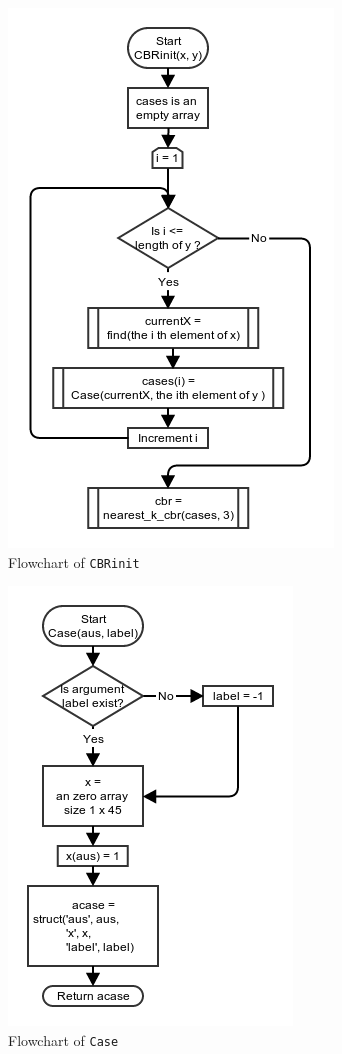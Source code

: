 \documentclass[10pt,a4paper]{article}
\begin{document}
\begin{figure}[!ht]
	\centering
	\includegraphics[scale=0.7]{images/flow_chart/cbrinit.png}
	\caption{Flowchart of \tt{CBRinit}}
	\label{fig:cbrinit}
\end{figure}

\begin{figure}[!ht]
	\centering
	\includegraphics[scale=0.7]{images/flow_chart/case.png}
	\caption{Flowchart of \tt{Case}}
	\label{fig:Case}
\end{figure}
\end{document}
